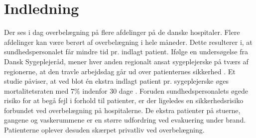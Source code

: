 \chapter{Indledning}
Der ses i dag overbelægning på flere afdelinger på de danske hospitaler. Flere afdelinger kan være berørt af overbelægning i hele måneder. \citep{2015} Dette resulterer i, at sundhedspersonalet får mindre tid pr. indlagt patient. Ifølge en undersøgelse fra Dansk Sygeplejeråd, mener hver anden regionalt ansat sygeplejerske på tværs af regionerne, at den travle arbejdsdag går ud over patienternes sikkerhed \citep{Kjeldsen2015}. Et studie påviser, at ved blot én ekstra indlagt patient pr. sygeplejerske øges mortalitetsraten med $7 \%$ indenfor 30 dage  \citep{Aiken2014}. 
Foruden sundhedspersonalets øgede risiko for at begå fejl i forhold til patienter, er der ligeledes en sikkerhedsrisiko forbundet ved overbelægning på hospitalerne. De ekstra patienter på stuerne, gangene og vaskerummene er en større udfordring ved evakuering under brand. Patienterne oplever desuden skærpet privatliv ved overbelægning.  \citep{Madsen2014} 
